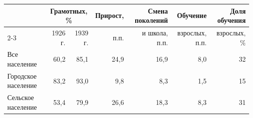 \begin{tabular}{lrrrrrr}
\toprule
 & \multicolumn{2}{c}{Грамотных, \%} & Прирост, & Смена поколений & Обучение & Доля обучения \\
\cmidrule(lr){2-3}
 & 1926 г. & 1939 г. & п.п. & и школа, п.п. & взрослых, п.п. & взрослых, \% \\
\midrule
Все население & 60,2 & 85,1 & 24,9 & 16,9 & 8,0 & 32 \\
Городское население & 83,2 & 93,0 & 9,8 & 8,3 & 1,5 & 15 \\
Сельское население & 53,4 & 79,9 & 26,6 & 18,3 & 8,3 & 31 \\
\bottomrule
\end{tabular}
